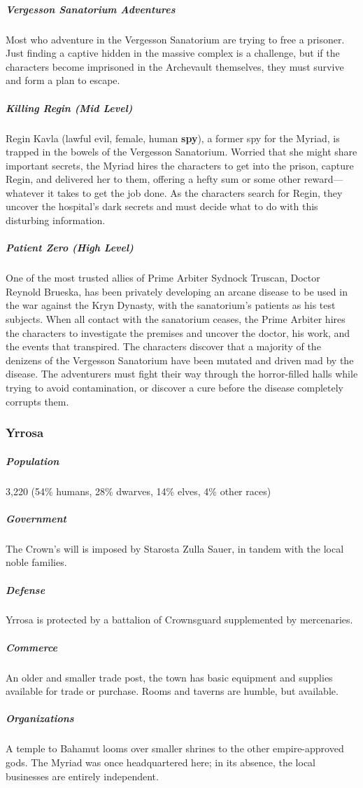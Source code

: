 \documentclass[10pt,a4paper,twoside,bg=print,twocolumn,openany,nodeprecatedcode]{dndbook}
\begin{document}
\subparagraph{Vergesson Sanatorium Adventures}
Most who adventure in the Vergesson Sanatorium are trying to free a prisoner. Just finding a captive hidden in the massive complex is a challenge, but if the characters become imprisoned in the Archevault themselves, they must survive and form a plan to escape.

\subparagraph{Killing Regin (Mid Level)}
Regin Kavla (lawful evil, female, human \textbf{spy}), a former spy for the Myriad, is trapped in the bowels of the Vergesson Sanatorium. Worried that she might share important secrets, the Myriad hires the characters to get into the prison, capture Regin, and delivered her to them, offering a hefty sum or some other reward—whatever it takes to get the job done. As the characters search for Regin, they uncover the hospital's dark secrets and must decide what to do with this disturbing information.

\subparagraph{Patient Zero (High Level)}
One of the most trusted allies of Prime Arbiter Sydnock Truscan, Doctor Reynold Brueska, has been privately developing an arcane disease to be used in the war against the Kryn Dynasty, with the sanatorium's patients as his test subjects. When all contact with the sanatorium ceases, the Prime Arbiter hires the characters to investigate the premises and uncover the doctor, his work, and the events that transpired. The characters discover that a majority of the denizens of the Vergesson Sanatorium have been mutated and driven mad by the disease. The adventurers must fight their way through the horror-filled halls while trying to avoid contamination, or discover a cure before the disease completely corrupts them.

\subsubsection{Yrrosa}
\subparagraph{Population}
3,220 (54\% humans, 28\% dwarves, 14\% elves, 4\% other races)

\subparagraph{Government}
The Crown's will is imposed by Starosta Zulla Sauer, in tandem with the local noble families.

\subparagraph{Defense}
Yrrosa is protected by a battalion of Crownsguard supplemented by mercenaries.

\subparagraph{Commerce}
An older and smaller trade post, the town has basic equipment and supplies available for trade or purchase. Rooms and taverns are humble, but available.

\subparagraph{Organizations}
A temple to Bahamut looms over smaller shrines to the other empire-approved gods. The Myriad was once headquartered here; in its absence, the local businesses are entirely independent.
\end{document}
